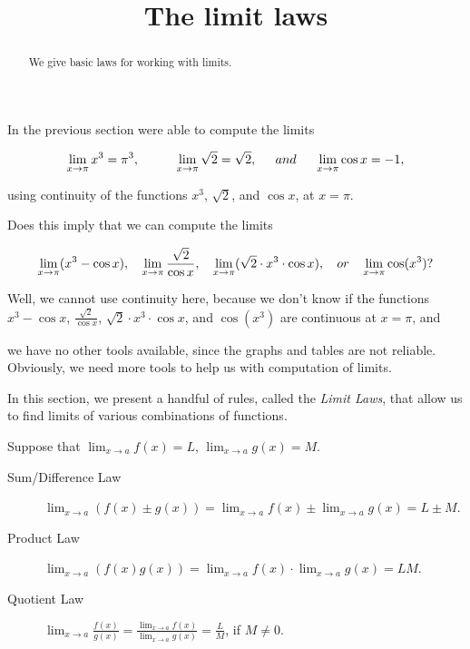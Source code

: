 \documentclass{ximera}
\title[Dig-In:]{The limit laws}
\begin{document}
\begin{abstract}
We give basic laws for working with limits. 
\end{abstract}
\maketitle
In the previous section were able to compute the limits

\[
\lim_{x\to \pi} x^3=\pi^3,\hspace{0.4in}\lim_{x\to \pi} \sqrt{2}=\sqrt{2},\hspace{0.2in}and\hspace{0.2in}\lim_{x\to \pi} \cos{x}= -1,
\]

using continuity of the functions $x^3$, $\sqrt{2}$, and $\cos{x}$, at $x=\pi$.


Does this imply that we can compute the limits

\[
\lim_{x\to \pi} (x^3-\cos{x}),\hspace{0.13in}\lim_{x\to \pi} \frac{\sqrt{2}}{\cos{x}},\hspace{0.13in} \lim_{x\to \pi} (\sqrt{2}\cdot x^3\cdot\cos{x}),\hspace{0.13in} or\hspace{0.13in}\lim_{x\to \pi} \cos({x^3})?
\]

Well, we cannot use continuity here, because we don't know if the functions $x^3-\cos{x}$,  $\frac{\sqrt{2}}{\cos{x}}$, $\sqrt{2}\cdot x^3\cdot\cos{x}$, and $\cos({x^3})$ are continuous at $x=\pi$,
and

 we have no other tools available, since the graphs and tables are not reliable. Obviously, we need more tools to help us with computation of limits.

 

In this section, we present a handful of rules, called the \textit{Limit Laws},
that allow us to find limits of various combinations of functions.

\begin{theorem}\label{theorem:limit-laws}
Suppose that $\lim_{x\to a}f(x)=L$, $\lim_{x\to a}g(x)=M$.
\begin{description}
\item[Sum/Difference Law] $\lim_{x\to a} (f(x) \pm g(x)) =
  \lim_{x\to a}f(x) \pm \lim_{x\to a}g(x)=L \pm M$.
\item[Product Law]  $\lim_{x\to a} (f(x)g(x)) = \lim_{x\to
  a}f(x)\cdot\lim_{x\to a}g(x)=LM$.
\item[Quotient Law]  $\lim_{x\to a} \frac{f(x)}{g(x)} =
  \frac{\lim_{x\to a}f(x)}{\lim_{x\to a}g(x)}=\frac{L}{M}$, if
  $M\ne0$.
\end{description}
\label{thm:limit laws}
\end{theorem}
\end{document}
